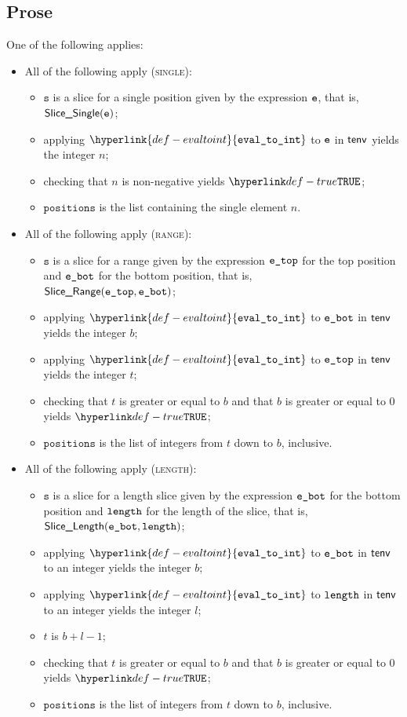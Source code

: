 \documentclass{book}
\newcommand\ProseOrTypeError[0]{\ProseTerminateAs{\TypeErrorConfig}}
\newcommand\evaltoint[0]{\hyperlink{def-evaltoint}{\texttt{eval\_to\_int}}}
\newcommand\vs[0]{\texttt{s}}
\newcommand\positions[0]{\texttt{positions}}
\begin{document}
\subsection{Prose}
One of the following applies:
\begin{itemize}
  \item All of the following apply (\textsc{single}):
  \begin{itemize}
    \item $\vs$ is a slice for a single position given by the expression $\texttt{e}$, that is, \\ $\textsf{Slice\_Single}(\texttt{e})$;
    \item applying $\evaltoint$ to $\texttt{e}$ in $\textsf{tenv}$ yields the integer $n$\ProseOrTypeError;
    \item checking that $n$ is non-negative yields $\True$\ProseOrTypeError;
    \item $\positions$ is the list containing the single element $n$.
  \end{itemize}

  \item All of the following apply (\textsc{range}):
  \begin{itemize}
    \item $\vs$ is a slice for a range given by the expression $\texttt{e\_top}$
          for the top position and $\texttt{e\_bot}$ for the bottom position, that is, \\ $\textsf{Slice\_Range}(\texttt{e\_top}, \texttt{e\_bot})$;
    \item applying $\evaltoint$ to $\texttt{e\_bot}$ in $\textsf{tenv}$ yields the integer $b$\ProseOrTypeError;
    \item applying $\evaltoint$ to $\texttt{e\_top}$ in $\textsf{tenv}$ yields the integer $t$\ProseOrTypeError;
    \item checking that $t$ is greater or equal to $b$ and that $b$ is greater or equal to $0$ yields $\True$\ProseOrTypeError;
    \item $\positions$ is the list of integers from $t$ down to $b$, inclusive.
  \end{itemize}

  \item All of the following apply (\textsc{length}):
  \begin{itemize}
    \item $\vs$ is a slice for a length slice given by the expression $\texttt{e\_bot}$
          for the bottom position and $\texttt{length}$ for the length of the slice, that is, \\ $\textsf{Slice\_Length}(\texttt{e\_bot}, \texttt{length})$;
    \item applying $\evaltoint$ to $\texttt{e\_bot}$ in $\textsf{tenv}$ to an integer yields the integer $b$\ProseOrTypeError;
    \item applying $\evaltoint$ to $\texttt{length}$ in $\textsf{tenv}$ to an integer yields the integer $l$\ProseOrTypeError;
    \item $t$ is $b + l - 1$;
    \item checking that $t$ is greater or equal to $b$ and that $b$ is greater or equal to $0$ yields $\True$\ProseOrTypeError;
    \item $\positions$ is the list of integers from $t$ down to $b$, inclusive.
  \end{itemize}


\end{itemize}
\end{document}

